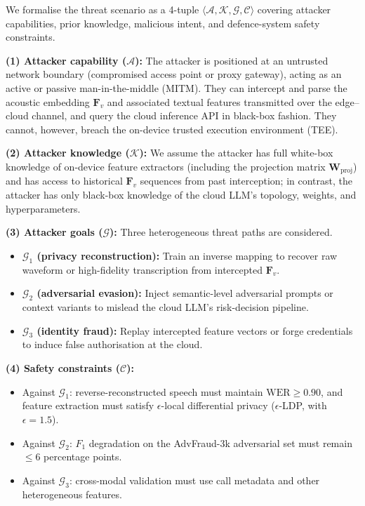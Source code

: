 \documentclass[11pt, a4paper]{article}
\begin{document}
We formalise the threat scenario as a 4-tuple $\langle \mathcal{A}, \mathcal{K}, \mathcal{G}, \mathcal{C} \rangle$ covering attacker capabilities, prior knowledge, malicious intent, and defence-system safety constraints.

\textbf{(1) Attacker capability ($\mathcal{A}$):} The attacker is positioned at an untrusted network boundary (compromised access point or proxy gateway), acting as an active or passive man-in-the-middle (MITM). They can intercept and parse the acoustic embedding $\bm{F}_v$ and associated textual features transmitted over the edge--cloud channel, and query the cloud inference API in black-box fashion. They cannot, however, breach the on-device trusted execution environment (TEE).

\textbf{(2) Attacker knowledge ($\mathcal{K}$):} We assume the attacker has full white-box knowledge of on-device feature extractors (including the projection matrix $\bm{W}_{\mathrm{proj}}$) and has access to historical $\bm{F}_v$ sequences from past interception; in contrast, the attacker has only black-box knowledge of the cloud LLM's topology, weights, and hyperparameters.

\textbf{(3) Attacker goals ($\mathcal{G}$):} Three heterogeneous threat paths are considered.
\begin{itemize}
    \item \textbf{$\mathcal{G}_1$ (privacy reconstruction):} Train an inverse mapping to recover raw waveform or high-fidelity transcription from intercepted $\bm{F}_v$.
    \item \textbf{$\mathcal{G}_2$ (adversarial evasion):} Inject semantic-level adversarial prompts or context variants to mislead the cloud LLM's risk-decision pipeline.
    \item \textbf{$\mathcal{G}_3$ (identity fraud):} Replay intercepted feature vectors or forge credentials to induce false authorisation at the cloud.
\end{itemize}

\textbf{(4) Safety constraints ($\mathcal{C}$):}
\begin{itemize}
    \item Against $\mathcal{G}_1$: reverse-reconstructed speech must maintain $\text{WER}\ge 0.90$, and feature extraction must satisfy $\epsilon$-local differential privacy ($\epsilon$-LDP, with $\epsilon = 1.5$).
    \item Against $\mathcal{G}_2$: $F_1$ degradation on the AdvFraud-3k adversarial set must remain $\le 6$ percentage points.
    \item Against $\mathcal{G}_3$: cross-modal validation must use call metadata and other heterogeneous features.
\end{itemize}
\end{document}
